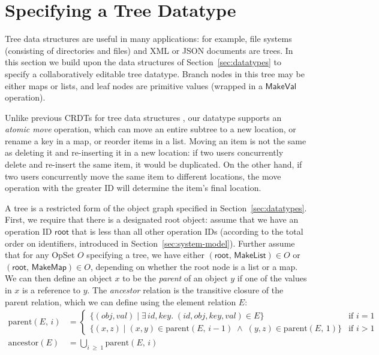\section{Specifying a Tree Datatype}\label{sec:tree}

Tree data structures are useful in many applications: for example, file systems (consisting of directories and files) and XML or JSON documents are trees.
In this section we build upon the data structures of Section~\ref{sec:datatypes} to specify a collaboratively editable tree datatype.
Branch nodes in this tree may be either maps or lists, and leaf nodes are primitive values (wrapped in a $\mathsf{MakeVal}$ operation).

Unlike previous CRDTs for tree data structures \cite{Martin:2010ih,Kleppmann:2016ve}, our datatype supports an \emph{atomic move} operation, which can move an entire subtree to a new location, or rename a key in a map, or reorder items in a list.
Moving an item is not the same as deleting it and re-inserting it in a new location: if two users concurrently delete and re-insert the same item, it would be duplicated.
On the other hand, if two users concurrently move the same item to different locations, the move operation with the greater ID will determine the item's final location.

A tree is a restricted form of the object graph specified in Section~\ref{sec:datatypes}.
First, we require that there is a designated root object: assume that we have an operation ID $\mathsf{root}$ that is less than all other operation IDs (according to the total order on identifiers, introduced in Section~\ref{sec:system-model}).
Further assume that for any OpSet $O$ specifying a tree, we have either $(\mathsf{root},\, \mathsf{MakeList}) \in O$ or $(\mathsf{root},\, \mathsf{MakeMap}) \in O$, depending on whether the root node is a list or a map.
We can then define an object $x$ to be the \emph{parent} of an object $y$ if one of the values in $x$ is a reference to $y$.
The \emph{ancestor} relation is the transitive closure of the parent relation, which we can define using the element relation $E$:
\begin{align*}
    \mathrm{parent}(E,\, i) &=
    \begin{cases}
        \big\{ (\mathit{obj}, \mathit{val}) \mid \exists\,\mathit{id}, \mathit{key}.\;
            (\mathit{id}, \mathit{obj}, \mathit{key}, \mathit{val}) \in E \big\} & \text{if } i=1 \\
        \big\{ (x, z) \mid (x, y) \in \mathrm{parent}(E,\, i-1) \;\wedge\;
            (y, z) \in \mathrm{parent}(E,\, 1) \big\} & \text{if } i > 1
    \end{cases} \\[8pt]
    \mathrm{ancestor}(E) &= \bigcup_{i \;\geq\; 1} \mathrm{parent}(E,\, i)
\end{align*}

